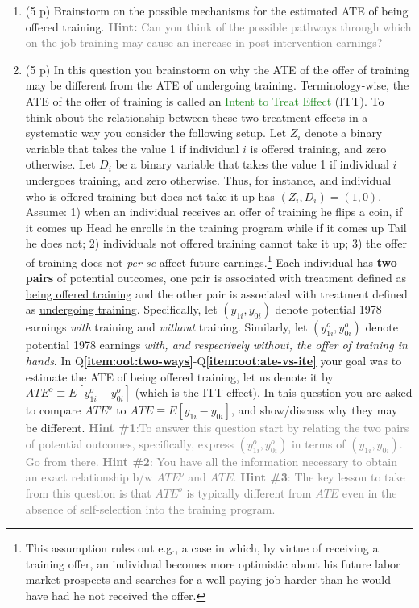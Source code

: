 \documentclass{article}
\begin{document}
\begin{enumerate}[label=\textbf{Q\arabic{enumi}}.,ref=Q\arabic{enumi}, wide=0pt, itemsep=1em, topsep=5pt]
\item (5 p) Brainstorm on the possible mechanisms for the estimated ATE of being offered training. \textcolor{gray}{\textbf{Hint:} Can you think of the possible pathways through which on-the-job training may cause an increase in post-intervention earnings?}\label{item:oot:ate-vs-ite}

\item (5 p) In this question you brainstorm on why the ATE of the offer of training may be different from the ATE of undergoing training. Terminology-wise, the ATE of the offer of training is called an \textcolor{ForestGreen}{Intent to Treat Effect} (ITT). To think about the relationship between these two treatment effects in a systematic way you consider the following setup. Let $Z_{i}$ denote a binary variable that takes the value 1 if individual $i$ is offered training, and zero otherwise. Let $D_{i}$ be a binary variable that takes the value 1 if individual $i$ undergoes training, and zero otherwise. Thus, for instance, and individual who is offered training but does not take it up has $\left( Z_{i},D_{i}\right) =\left( 1,0\right) $. Assume: 1) when an individual receives an offer of training he flips a coin, if it comes up Head he enrolls in the training program while if it comes up Tail he does not; 2) individuals not offered training cannot take it up; 3) the offer of training does not \textit{per se} affect future earnings.\footnote{This assumption rules out e.g., a case in which, by virtue of receiving a training offer, an individual becomes more optimistic about his future labor market prospects and searches for a well paying job harder than he would have had he not received the offer.} Each individual has \textbf{two pairs} of potential outcomes, one pair is associated with treatment defined as \underline{being offered training} and the other pair is associated with treatment defined as \underline{undergoing training}. Specifically, let $\left( y_{1i},y_{0i}\right) $ denote potential 1978 earnings \textit{with} training and \textit{without} training. Similarly, let $\left( y_{1i}^{o},y_{0i}^{o}\right) $ denote potential 1978 earnings \textit{with, and respectively without, the offer of training in hands}. In Q\textbf{\ref{item:oot:two-ways}}-Q\textbf{\ref{item:oot:ate-vs-ite}} your goal was to estimate the ATE of being offered training, let us denote it by $ATE^{o}\equiv E\left[ y_{1i}^{o}-y_{0i}^{o}\right]$ (which is the ITT effect). In this question you are asked to compare $ATE^{o}$ to $ATE\equiv E\left[ y_{1i}-y_{0i}\right]$, and show/discuss why they may be different. \textcolor{gray}{\textbf{Hint \#1}:To answer this question start by relating the two pairs of potential outcomes, specifically, express $\left( y_{1i}^{o},y_{0i}^{o}\right)$ in terms of $\left( y_{1i},y_{0i}\right)$. Go from there. \textbf{Hint \#2}: You have all the information necessary to obtain an exact relationship b/w $ATE^{o}$ and $ATE$. \textbf{Hint \#3}: The key lesson to take from this question is that $ATE^{o}$ is typically different from $ATE$ even in the absence of self-selection into the training program.}
\end{enumerate}
\end{document}
